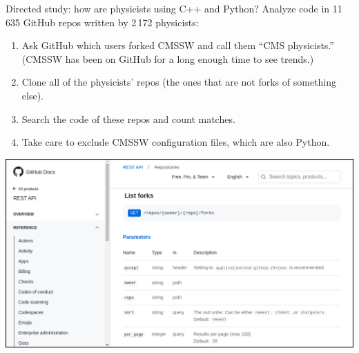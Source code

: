 \documentclass[aspectratio=169]{beamer}
\begin{document}
\begin{frame}{Directed study: how are physicists using C++ and Python?}
\vspace{0.5 cm}
{\Large Analyze code in 11\,635 GitHub repos written by 2\,172 physicists:}

\vspace{0.25 cm}
\begin{enumerate}
\item Ask GitHub which users forked CMSSW and call them ``CMS physicists.'' (CMSSW has been on GitHub for a long enough time to see trends.)
\item Clone all of the physicists' repos (the ones that are not forks of something else).
\item Search the code of these repos and count matches.
\item Take care to exclude CMSSW configuration files, which are also Python.
\end{enumerate}

\begin{center}
\includegraphics[width=0.5\linewidth]{github-api-website.png}
\end{center}
\end{frame}
\end{document}
